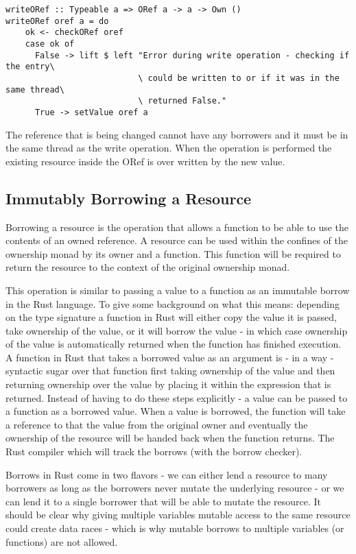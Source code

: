 \documentclass[onehalf,11pt]{beavtex}
\begin{document}
\begin{verbatim}
writeORef :: Typeable a => ORef a -> a -> Own ()
writeORef oref a = do
    ok <- checkORef oref
    case ok of
      False -> lift $ left "Error during write operation - checking if the entry\
                           \ could be written to or if it was in the same thread\
                           \ returned False."
      True -> setValue oref a
\end{verbatim}

The reference that is being changed cannot have any borrowers and it must
be in the same thread as the write operation.
When the operation is performed the existing resource inside the ORef is over
written by the new value.


\subsection{Immutably Borrowing a Resource}

Borrowing a resource is the operation that allows a function to be able to use
the contents of an owned reference.
A resource can be used within the confines of the ownership monad by its owner
and a function. This function will be required to return the resource to the
context of the original ownership monad.

This operation is similar to passing a value to a function as an immutable
borrow in the Rust language.  To give some background on what this means:
depending on the type signature a function in Rust will either copy the value
it is passed, take ownership of the value, or it will borrow the value - in
which case ownership of the value is automatically returned when the function
has finished execution.\cite{rust_book_ownership}
A function in Rust that takes a borrowed value as an argument is - in a way -
syntactic sugar over that function first taking ownership of the value and then
returning ownership over the value by placing it within the expression that is
returned.
Instead of having to do these steps explicitly - a value can be passed to a
function as a borrowed value.  When a value is borrowed, the function will take
a reference to that the value from the original owner and eventually the
ownership of the resource will be handed back when the function returns.
The Rust compiler which will track the borrows (with the borrow checker).

Borrows in Rust come in two flavors - we can either lend a resource to many
borrowers as long as the borrowers never mutate the underlying resource - or we
can lend it to a single borrower that will be able to mutate the
resource.\cite{rust_book_borrowing}
It should be clear why giving multiple variables mutable access to
the same resource could create data races - which is why mutable borrows to
multiple variables (or functions) are not allowed.
\end{document}
